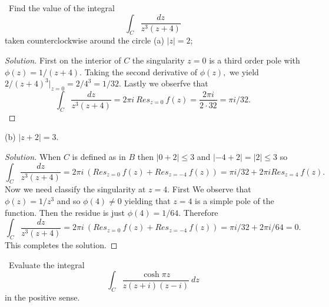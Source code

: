 \documentclass[11pt]{amsart}
\theoremstyle{definition}
\numberwithin{theorem}{section}
\numberwithin{definition}{section}
\numberwithin{equation}{section}
\newenvironment{solution}
  {\begin{proof}[Solution]}
  {\end{proof}}
\begin{document}
\medskip {}\  Find the value of the integral
\begin{equation*}
	\int_C \frac{dz}{z^3(z+4)}
\end{equation*}
taken counterclockwise around the circle (a) $|z| =2$;
\begin{solution}
	First on the interior of $C$ the singularity $z = 0$ is a third order pole with $\phi(z) = 1/(z+4).$ Taking
	the second derivative of $\phi(z),$ we yield $2/(z+4)^3|_{z= 0} = 2/4^3 = 1/32.$ Lastly we obserfve that
	\begin{equation*}
	\int_C \frac{dz}{z^3(z+4)} = 2\pi i\ Res_{z=0}\ f(z) =\frac{2\pi i}{2\cdot 32} =  \pi i/32.
	\end{equation*}
\end{solution}


  (b) $|z+2| =3.$
  \begin{solution}
  	When $C$ is defined as in $B$ then $|0 + 2| \leq 3$ and $|-4 + 2| = |2| \leq 3$ so
  		\begin{equation*}
	\int_C \frac{dz}{z^3(z+4)} = 2\pi i\ ( Res_{z=0}\ f(z) +  Res_{z=-4}\ f(z)) =  \pi i/32 + 2\pi i  Res_{z=4}\ f(z).
	\end{equation*}
	Now we need classify the singularity at $z = 4.$ First We observe that $\phi(z) = 1/z^3$ and so $\phi(4) \neq 0$ yielding that $z = 4$ is a simple pole of the function. Then the residue is just $\phi(4) = 1/64.$ Therefore
	\begin{equation*}
	\int_C \frac{dz}{z^3(z+4)} = 2\pi i\ ( Res_{z=0}\ f(z) +  Res_{z=-4}\ f(z)) =  \pi i/32 + 2\pi i/64 = 0.
	\end{equation*}
	This completes the solution.
  \end{solution}
\medskip {}\  Evaluate the integral
\begin{equation*}
	\int_C \frac{\cosh \pi z}{z(z+i)(z-i)}\ dz
\end{equation*}
in the positive sense.
\end{document}
